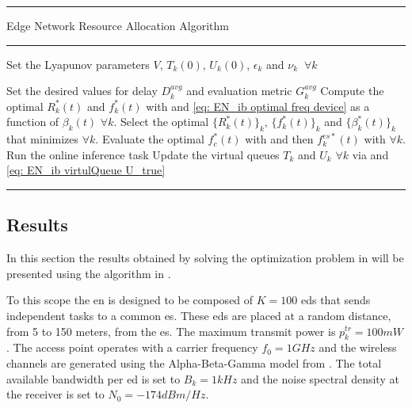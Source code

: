 \begin{table}[ht]
    \centering
    \rule{\textwidth}{0.4pt} %
    \vspace{-22pt} %
    \caption{Edge Network Resource Allocation Algorithm}
    \vspace{-10pt} %
    \rule{\textwidth}{0.4pt} %
    \vspace{-15pt} %
        \begin{algorithmic}[1]
            \item Set the Lyapunov parameters $V$, $T_k(0)$, $U_k(0)$, $\epsilon_k$ and $\nu_k \;\;\forall k$
            \item Set the desired values for delay $D_k^{avg}$ and evaluation metric $G_k^{avg}$
                \State Compute the optimal $R_k^*(t)$ and $f_k^*(t)$ with  and \eqref{eq: EN_ib optimal freq device} as a function of $\beta_k(t)$ $\forall k$.
                \State Select the optimal $\{R_k^*(t)\}_k$,  $\{f_k^*(t)\}_k$ and $\{\beta_k^*(t)\}_k$ that minimizes  $\forall k$.
                \State Evaluate the optimal $f_c^*(t)$ with  and then $f_k^{es*}(t)$ with  $\forall k$.
                \State Run the online inference task
                \State Update  the virtual queues $T_k$ and $U_k$ $\forall k$ via  and \eqref{eq: EN_ib virtulQueue U_true}
                
            \EndFor
        \end{algorithmic}
    \vspace{-10pt} %
    \rule{\textwidth}{0.4pt} %
    \label{tab: EN_ib algorithm}
\end{table}


\subsection{Results}
In this section the results obtained by solving the optimization problem in  will be presented using the algorithm in . 

To this scope the \gls{en} is designed to be composed of $K=100$ \glspl{ed} that sends independent tasks to a common \gls{es}. These \glspl{ed} are placed at a random distance, from 5 to 150 meters, from the \gls{es}. The maximum transmit power is $p_k^{tr} = 100mW$ . The access point operates with a carrier frequency $f_0 = 1GHz$ and the wireless channels are generated using the Alpha-Beta-Gamma model from \cite{MacCartney2016AlphaBetaGamma}. The total available bandwidth per \gls{ed} is set to $ B_k = 1kHz $ and the noise spectral density at the receiver is set to $ N_0 = -174  dBm/Hz $.

